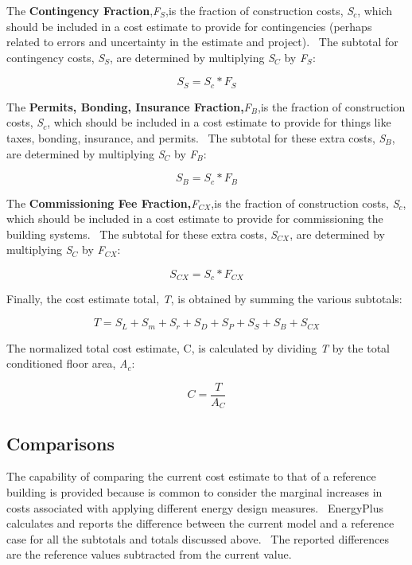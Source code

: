 The \textbf{Contingency Fraction},\emph{F\(_{S}\)},is the fraction of construction costs, \emph{S\(_{c}\)}, which should be included in a cost estimate to provide for contingencies (perhaps related to errors and uncertainty in the estimate and project).~ The subtotal for contingency costs, \emph{S\(_{S}\)}, are determined by multiplying \emph{S\(_{C}\)} by \emph{F\(_{S}\)}:

\begin{equation}
{S_S} = {S_c}*{F_S}
\end{equation}

The \textbf{Permits, Bonding, Insurance Fraction,}\emph{F\(_{B}\)},is the fraction of construction costs, \emph{S\(_{c}\)}, which should be included in a cost estimate to provide for things like taxes, bonding, insurance, and permits.~ The subtotal for these extra costs, \emph{S\(_{B}\)}, are determined by multiplying \emph{S\(_{C}\)} by \emph{F\(_{B}\)}:

\begin{equation}
{S_B} = {S_c}*{F_B}
\end{equation}

The \textbf{Commissioning Fee Fraction,}\emph{F\(_{CX}\)},is the fraction of construction costs, \emph{S\(_{c}\)}, which should be included in a cost estimate to provide for commissioning the building systems.~ The subtotal for these extra costs, \emph{S\(_{CX}\)}, are determined by multiplying \emph{S\(_{C}\)} by \emph{F\(_{CX}\)}:

\begin{equation}
{S_{CX}} = {S_c}*{F_{CX}}
\end{equation}

Finally, the cost estimate total, \emph{T}, is obtained by summing the various subtotals:

\begin{equation}
T = {S_L} + {S_m} + {S_r} + {S_D} + {S_P} + {S_S} + {S_B} + {S_{CX}}
\end{equation}

The normalized total cost estimate, C, is calculated by dividing \emph{T} by the total conditioned floor area, \emph{A\(_{c}\)}:

\begin{equation}
C = \frac{T}{{{A_C}}}
\end{equation}

\subsection{Comparisons}\label{comparisons}

The capability of comparing the current cost estimate to that of a reference building is provided because is common to consider the marginal increases in costs associated with applying different energy design measures.~ EnergyPlus calculates and reports the difference between the current model and a reference case for all the subtotals and totals discussed above.~ The reported differences are the reference values subtracted from the current value.
